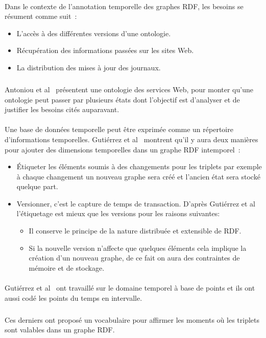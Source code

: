 \documentclass[12pt,a4]{report}
\begin{document}
\paragraph{}
Dans le contexte de l'annotation temporelle des graphes RDF, les besoins se résument comme suit~:
\begin{itemize}
\item L'accès à des différentes versions d’une ontologie.
\item Récupération des informations passées sur les sites Web.
\item La distribution des mises à jour des journaux.
\end{itemize}
\subparagraph{}
Antoniou et al~\cite{antoniou2004} présentent une ontologie des services Web, pour monter qu'une ontologie peut passer par plusieurs états dont l'objectif est d'analyser et de justifier les besoins cités auparavant.
\paragraph{}
Une base de données temporelle peut être exprimée comme un répertoire d'informations temporelles.
Gutiérrez et al~\cite{gutierrez2007} montrent qu'il y aura deux manières pour ajouter des dimensions temporelles dans un graphe RDF intemporel~:
\begin{itemize}
\item Étiqueter les éléments soumis à des changements pour les triplets par exemple à chaque changement un nouveau graphe sera créé et l’ancien état sera stocké quelque part.
\item Versionner, c'est le capture de temps de transaction. D'après Gutiérrez et al~\cite{gutierrez2007} l’étiquetage est mieux que les versions pour les raisons suivantes:
\begin{itemize}
\item Il conserve le principe de la nature distribuée et extensible de RDF.
\item Si la nouvelle version n’affecte que quelques éléments cela implique la création d’un nouveau graphe, de ce fait on aura des contraintes de mémoire et de stockage. 
\end{itemize}
\end{itemize}
\paragraph{}
Gutiérrez et al~\cite{gutierrez2007} ont travaillé sur le domaine temporel à base de points et ils ont aussi codé les points du temps en intervalle.
\subparagraph{}
Ces derniers ont proposé un vocabulaire pour affirmer les moments où les triplets sont valables dans un graphe RDF.
\end{document}
